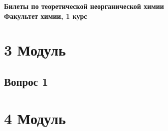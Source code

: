 \documentclass[14pt,a4paper]{scrartcl}
\begin{document}
	\begin{flushright}
	\textbf{Билеты по теоретической неорганической химии\\
		Факультет химии, 1 курс}
\end{flushright}  	

\section{3 Модуль}


\subsection{Вопрос 1}


%



\section{4 Модуль}

%


%

%
\end{document}

